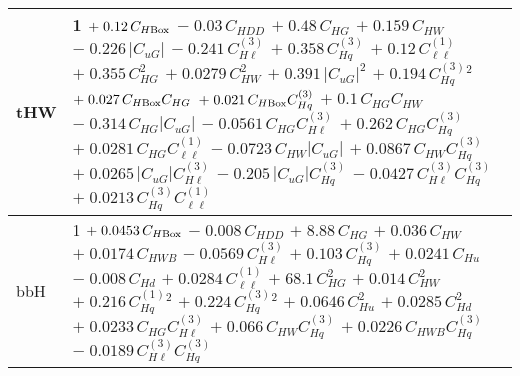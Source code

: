 \begin{tabular}{l|p{}}
    tHW & 1 $+\;0.12\,C_{H\rm{Box}}$ $-\;0.03\,C_{HDD}$ $+\;0.48\,C_{HG}$ $+\;0.159\,C_{HW}$ $-\;0.226\,|C_{uG}|$ $-\;0.241\,C^{(3)}_{H\ell}$ $+\;0.358\,C^{(3)}_{Hq}$ $+\;0.12\,C^{(1)}_{\ell\ell}$ $+\;0.355\,C_{HG}^{2}$ $+\;0.0279\,C_{HW}^{2}$ $+\;0.391\,|C_{uG}|^{2}$ $+\;0.194\,C^{(3)}_{Hq}^{2}$ $+\;0.027\,C_{H\rm{Box}}C_{HG}$ $+\;0.021\,C_{H\rm{Box}}C^{(3)}_{Hq}$ $+\;0.1\,C_{HG}C_{HW}$ $-\;0.314\,C_{HG}|C_{uG}|$ $-\;0.0561\,C_{HG}C^{(3)}_{H\ell}$ $+\;0.262\,C_{HG}C^{(3)}_{Hq}$ $+\;0.0281\,C_{HG}C^{(1)}_{\ell\ell}$ $-\;0.0723\,C_{HW}|C_{uG}|$ $+\;0.0867\,C_{HW}C^{(3)}_{Hq}$ $+\;0.0265\,|C_{uG}|C^{(3)}_{H\ell}$ $-\;0.205\,|C_{uG}|C^{(3)}_{Hq}$ $-\;0.0427\,C^{(3)}_{H\ell}C^{(3)}_{Hq}$ $+\;0.0213\,C^{(3)}_{Hq}C^{(1)}_{\ell\ell}$ \\
    \hline
    bbH & 1 $+\;0.0453\,C_{H\rm{Box}}$ $-\;0.008\,C_{HDD}$ $+\;8.88\,C_{HG}$ $+\;0.036\,C_{HW}$ $+\;0.0174\,C_{HWB}$ $-\;0.0569\,C^{(3)}_{H\ell}$ $+\;0.103\,C^{(3)}_{Hq}$ $+\;0.0241\,C_{Hu}$ $-\;0.008\,C_{Hd}$ $+\;0.0284\,C^{(1)}_{\ell\ell}$ $+\;68.1\,C_{HG}^{2}$ $+\;0.014\,C_{HW}^{2}$ $+\;0.216\,C^{(1)}_{Hq}^{2}$ $+\;0.224\,C^{(3)}_{Hq}^{2}$ $+\;0.0646\,C_{Hu}^{2}$ $+\;0.0285\,C_{Hd}^{2}$ $+\;0.0233\,C_{HG}C^{(3)}_{H\ell}$ $+\;0.066\,C_{HW}C^{(3)}_{Hq}$ $+\;0.0226\,C_{HWB}C^{(3)}_{Hq}$ $-\;0.0189\,C^{(3)}_{H\ell}C^{(3)}_{Hq}$ \\
    \hline
\end{tabular}
